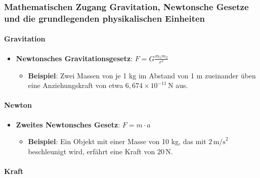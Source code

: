 \documentclass{vorlage-design-main}
\begin{document}
\hypertarget{mathematischen-zugang-gravitation-newtonsche-gesetze-und-die-grundlegenden-physikalischen-einheiten}{%
\subsubsection{Mathematischen Zugang Gravitation, Newtonsche Gesetze und
die grundlegenden physikalischen
Einheiten}\label{mathematischen-zugang-gravitation-newtonsche-gesetze-und-die-grundlegenden-physikalischen-einheiten}}

\hypertarget{gravitation}{%
\paragraph{Gravitation}\label{gravitation}}

\begin{itemize}

\item
  \textbf{Newtonsches Gravitationsgesetz}: $F = G \frac{m_1 m_2}{r^2}$

  \begin{itemize}
  
  \item
    \textbf{Beispiel}: Zwei Massen von je 1 kg im Abstand von 1 m
    zueinander üben eine Anziehungskraft von etwa
    $6,674 \times 10^{-11} \, \text{N}$ aus.
  \end{itemize}
\end{itemize}

\hypertarget{newton-1}{%
\paragraph{Newton}\label{newton-1}}

\begin{itemize}

\item
  \textbf{Zweites Newtonsches Gesetz}: $F = m \cdot a$

  \begin{itemize}
  
  \item
    \textbf{Beispiel}: Ein Objekt mit einer Masse von 10 kg, das mit
    $2 \, \text{m/s}^2$ beschleunigt wird, erfährt eine Kraft von
    $20 \, \text{N}$.
  \end{itemize}
\end{itemize}

\hypertarget{kraft}{%
\paragraph{Kraft}\label{kraft}}
\end{document}

